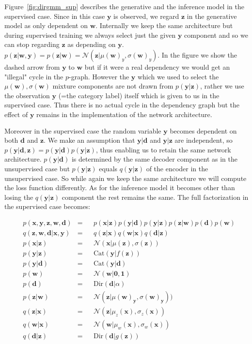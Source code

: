 \documentclass[11pt, a4paper]{report}
\theoremstyle{plain}
\theoremstyle{definition}
\theoremstyle{remark}
\newcommand{\x}{\mathbf{x}}
\newcommand{\z}{\mathbf{z}}
\newcommand{\y}{\mathbf{y}}
\newcommand{\w}{\mathbf{w}}
\newcommand{\dd}{\mathbf{d}}
\newcommand{\NN}{\mathcal{N}}
\newcommand{\bv}[1]{\boldsymbol{#1}}
\begin{document}
Figure~\ref{fig:dirgmm_sup} describes the generative and the inference model in
the supervised case.
Since in this case $\y$ is observed, we regard $\z$ in the generative model
as only dependent on $\w$. Internally we keep the same architecture but during
supervised training we always select just the given $\y$ component and so we
can stop regarding $\z$ as depending on $\y$.
$p(\z | \w, \y) = p(\z | \w) = \NN(\z | \mu(\w)_y, \sigma(\w)_y)$.
In the figure we show the dashed arrow from $\y$ to $\w$ but if it were a real
dependency we would get an "illegal" cycle in the $p$-graph. However the $\y$
which we used to select the $\mu(\w), \sigma(\w)$ mixture components are not
drawn from $p(\y | \z)$, rather we use the observation $\y$ (=the category
label) itself which is
given to us in the supervised case. Thus there is no actual cycle in the
dependency graph but the effect of $\y$ remains in the implementation of the
network architecture. 

Moreover in the supervised case the random variable $\y$ becomes dependent on both $\dd$ and $\z$.
We make an assumption that $\y | \dd$ and $\y | \z$ are independent, so
$p(\y | \dd, \z) = p(\y | \dd)p(\y | \z)$, thus enabling us to retain the same 
network architecture. $p(\y | \dd)$ is determined by
the same decoder component as in the unsupervised case but $p(\y | \z)$ equals 
$q(\y | \z)$ of the encoder in the unsupervised case. So while again we keep the same
architecture we will compute the loss function differently.
As for the inference model it becomes other than losing the $q(\y | \z)$
component the rest remains the same.
The full factorization in the supervised case becomes:

\begin{equation}
\begin{aligned}
&p(\x, \y, \z, \w, \dd) &=& 
&p(\x | \z) p(\y | \dd) p(\y | \z) p(\z | \w) p(\dd) p(\w) \\
&q(\z, \w, \dd | \x, \y) &=& 
&q(\z | \x) q(\w | \x) q(\dd | \z) \\
&p(\x | \z) &=& & \NN(\x | \mu(\z), \sigma(\z)) \\
&p(\y | \z) &=& &\text{Cat}(\y | f(\z)) \\
&p(\y | \dd) &=& & \text{Cat}(\y | \dd) \\
&p(\w) &=& & \NN(\w | \bv{0},\bv{1}) \\
&p(\dd) &=& & \text{Dir}(\dd | \alpha) \\
&p(\z | \w) &=& & \NN(\z | \mu(\w)_{\y}, \sigma(\w)_{\y})) \\
&q(\z | \x) &=& &\NN(\z | \mu_z(\x), \sigma_z(\x)) \\
&q(\w | \x) &=& &\NN(\w | \mu_w(\x), \sigma_w(\x)) \\
&q(\dd | \z) &=& &\text{Dir}(\dd | g(\z))
\label{eq:gmmfact_supervised}
\end{aligned}
\end{equation}
\end{document}

